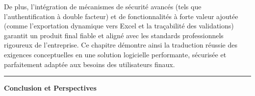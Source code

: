 \documentclass[12pt, a4paper, openany]{report}
\begin{document}
De plus, l'intégration de mécanismes de sécurité avancés (tels que l'authentification à double facteur) et de fonctionnalités à forte valeur ajoutée (comme l'exportation dynamique vers Excel et la traçabilité des validations) garantit un produit final fiable et aligné avec les standards professionnels rigoureux de l'entreprise. Ce chapitre démontre ainsi la traduction réussie des exigences conceptuelles en une solution logicielle performante, sécurisée et parfaitement adaptée aux besoins des utilisateurs finaux.

\newpage
\thispagestyle{frontmatter}
{}

\vspace*{0.1cm}

\noindent
\textcolor{royalBlue}{\rule{0.25\textwidth}{1pt}}
\hfill
{\fontsize{24}{28}\selectfont\color{royalBlue}\bfseries Conclusion et Perspectives}

\vspace{0.1cm}
\end{document}
